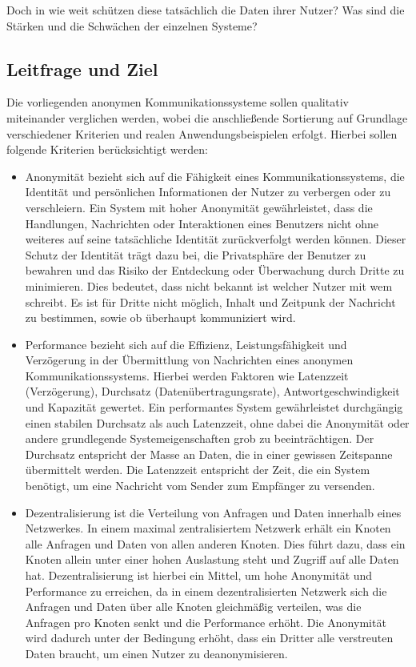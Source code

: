 Doch in wie weit schützen diese tatsächlich die Daten ihrer Nutzer? Was sind die Stärken und die Schwächen der einzelnen Systeme? 

\subsection{Leitfrage und Ziel}

Die vorliegenden anonymen Kommunikationssysteme sollen qualitativ miteinander verglichen werden, wobei die anschließende Sortierung auf Grundlage verschiedener Kriterien und realen Anwendungsbeispielen erfolgt. Hierbei sollen folgende Kriterien berücksichtigt werden:

\begin{itemize}

\item Anonymität bezieht sich auf die Fähigkeit eines Kommunikationssystems, die Identität und persönlichen Informationen der Nutzer zu verbergen oder zu verschleiern. Ein System mit hoher Anonymität gewährleistet, dass die Handlungen, Nachrichten oder Interaktionen eines Benutzers nicht ohne weiteres auf seine tatsächliche Identität zurückverfolgt werden können. Dieser Schutz der Identität trägt dazu bei, die Privatsphäre der Benutzer zu bewahren und das Risiko der Entdeckung oder Überwachung durch Dritte zu minimieren. Dies bedeutet, dass nicht bekannt ist welcher Nutzer mit wem schreibt. Es ist für Dritte nicht möglich, Inhalt und Zeitpunk der Nachricht zu bestimmen, sowie ob überhaupt kommuniziert wird.

\item Performance bezieht sich auf die Effizienz, Leistungsfähigkeit und Verzögerung in der Übermittlung von Nachrichten eines anonymen Kommunikationssystems. Hierbei werden Faktoren wie Latenzzeit (Verzögerung), Durchsatz (Datenübertragungsrate), Antwortgeschwindigkeit und Kapazität gewertet. Ein performantes System gewährleistet durchgängig einen stabilen Durchsatz als auch Latenzzeit, ohne dabei die Anonymität oder andere grundlegende Systemeigenschaften grob zu beeinträchtigen. Der Durchsatz entspricht der Masse an Daten, die in einer gewissen Zeitspanne übermittelt werden. Die Latenzzeit entspricht der Zeit, die ein System benötigt, um eine Nachricht vom Sender zum Empfänger zu versenden.

\item Dezentralisierung ist die Verteilung von Anfragen und Daten innerhalb eines Netzwerkes. In einem maximal zentralisiertem Netzwerk erhält ein Knoten alle Anfragen und Daten von allen anderen Knoten. Dies führt dazu, dass ein Knoten allein unter einer hohen Auslastung steht und Zugriff auf alle Daten hat. Dezentralisierung ist hierbei ein Mittel, um hohe Anonymität und Performance zu erreichen, da in einem dezentralisierten Netzwerk sich die Anfragen und Daten über alle Knoten gleichmäßig verteilen, was die Anfragen pro Knoten senkt und die Performance erhöht. Die Anonymität wird dadurch unter der Bedingung erhöht, dass ein Dritter alle verstreuten Daten braucht, um einen Nutzer zu deanonymisieren.


\end{itemize}
